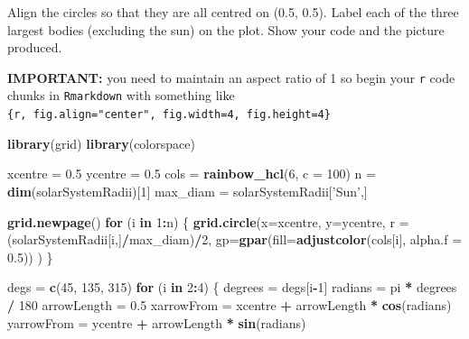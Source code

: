 \documentclass[9pt,letter]{article}
\newenvironment{Shaded}{\begin{snugshade}}{\end{snugshade}}
\newcommand{\KeywordTok}[1]{\textcolor[rgb]{0.13,0.29,0.53}{\textbf{#1}}}
\newcommand{\DataTypeTok}[1]{\textcolor[rgb]{0.13,0.29,0.53}{#1}}
\newcommand{\DecValTok}[1]{\textcolor[rgb]{0.00,0.00,0.81}{#1}}
\newcommand{\FloatTok}[1]{\textcolor[rgb]{0.00,0.00,0.81}{#1}}
\newcommand{\StringTok}[1]{\textcolor[rgb]{0.31,0.60,0.02}{#1}}
\newcommand{\ControlFlowTok}[1]{\textcolor[rgb]{0.13,0.29,0.53}{\textbf{#1}}}
\newcommand{\OperatorTok}[1]{\textcolor[rgb]{0.81,0.36,0.00}{\textbf{#1}}}
\newcommand{\NormalTok}[1]{#1}
\begin{document}
Align the circles so that they are all centred on (0.5, 0.5). Label each
of the three largest bodies (excluding the sun) on the plot. Show your
code and the picture produced.

\textbf{IMPORTANT:} you need to maintain an aspect ratio of 1 so begin
your \texttt{r} code chunks in \texttt{Rmarkdown} with something like
\texttt{\{r,\ fig.align="center",\ fig.width=4,\ fig.height=4\}}

\begin{Shaded}
\begin{Highlighting}[]
\KeywordTok{library}\NormalTok{(grid)}
\KeywordTok{library}\NormalTok{(colorspace)}

\NormalTok{xcentre =}\StringTok{ }\FloatTok{0.5}
\NormalTok{ycentre =}\StringTok{ }\FloatTok{0.5}
\NormalTok{cols =}\StringTok{ }\KeywordTok{rainbow_hcl}\NormalTok{(}\DecValTok{6}\NormalTok{, }\DataTypeTok{c =} \DecValTok{100}\NormalTok{)}
\NormalTok{n =}\StringTok{ }\KeywordTok{dim}\NormalTok{(solarSystemRadii)[}\DecValTok{1}\NormalTok{]}
\NormalTok{max_diam =}\StringTok{ }\NormalTok{solarSystemRadii[}\StringTok{'Sun'}\NormalTok{,]}
  
\KeywordTok{grid.newpage}\NormalTok{()}
\ControlFlowTok{for}\NormalTok{ (i }\ControlFlowTok{in} \DecValTok{1}\OperatorTok{:}\NormalTok{n) \{}
  \KeywordTok{grid.circle}\NormalTok{(}\DataTypeTok{x=}\NormalTok{xcentre,}
              \DataTypeTok{y=}\NormalTok{ycentre,}
              \DataTypeTok{r =}\NormalTok{ (solarSystemRadii[i,]}\OperatorTok{/}\NormalTok{max_diam)}\OperatorTok{/}\DecValTok{2}\NormalTok{,}
              \DataTypeTok{gp=}\KeywordTok{gpar}\NormalTok{(}\DataTypeTok{fill=}\KeywordTok{adjustcolor}\NormalTok{(cols[i], }\DataTypeTok{alpha.f =} \FloatTok{0.5}\NormalTok{))}
\NormalTok{  )}
\NormalTok{\}}

\NormalTok{degs =}\StringTok{ }\KeywordTok{c}\NormalTok{(}\DecValTok{45}\NormalTok{, }\DecValTok{135}\NormalTok{, }\DecValTok{315}\NormalTok{)}
\ControlFlowTok{for}\NormalTok{ (i }\ControlFlowTok{in} \DecValTok{2}\OperatorTok{:}\DecValTok{4}\NormalTok{) \{}
\NormalTok{  degrees =}\StringTok{ }\NormalTok{degs[i}\OperatorTok{-}\DecValTok{1}\NormalTok{]}
\NormalTok{  radians =}\StringTok{ }\NormalTok{pi }\OperatorTok{*}\StringTok{ }\NormalTok{degrees }\OperatorTok{/}\StringTok{ }\DecValTok{180}
\NormalTok{  arrowLength =}\StringTok{ }\FloatTok{0.5} 
\NormalTok{  xarrowFrom =}\StringTok{ }\NormalTok{xcentre }\OperatorTok{+}\StringTok{ }\NormalTok{arrowLength }\OperatorTok{*}\StringTok{ }\KeywordTok{cos}\NormalTok{(radians)}
\NormalTok{  yarrowFrom =}\StringTok{ }\NormalTok{ycentre }\OperatorTok{+}\StringTok{ }\NormalTok{arrowLength }\OperatorTok{*}\StringTok{ }\KeywordTok{sin}\NormalTok{(radians)}
  

\end{Highlighting}
\end{Shaded}
\end{document}
